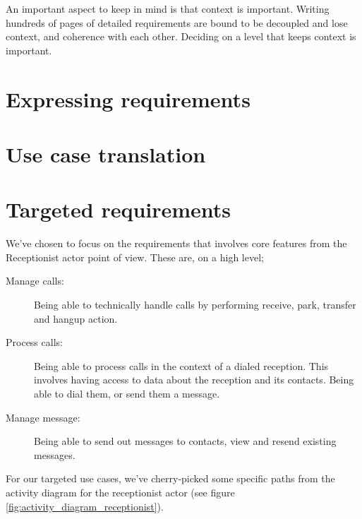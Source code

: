 \documentclass[10pt]{scrreprt}
\begin{document}
An important aspect to keep in mind is that context is important. Writing hundreds of pages of detailed requirements are bound to be decoupled and lose context, and coherence with each other. Deciding on a level that keeps context is important.

\section{Expressing requirements}

\section{Use case translation}


\section{Targeted requirements}
We've chosen to focus on the requirements that involves core features from the Receptionist actor point of view. These are, on a high level;
\begin{description}
  \item[Manage calls:] Being able to technically handle calls by performing receive, park, transfer and hangup action.
  \item[Process calls:] Being able to process calls in the context of a dialed reception. This involves having access to data about the reception and its contacts. Being able to dial them, or send them a message.
  \item[Manage message:] Being able to send out messages to contacts, view and resend existing messages.
\end{description}

For our targeted use cases, we've cherry-picked some specific paths from the activity diagram for the receptionist actor (see figure \ref{fig:activity_diagram_receptionist}).
\end{document}
